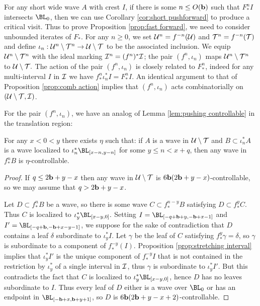 \documentclass[12pt]{amsart}
\begin{document}
For any short wide wave $A$ with crest $I$, if there is some $n\leq O(\mathbf b)$ such that $F_*^nI$ intersects $\BL_0$, then we can use Corollary \ref{cor:short pushforward} to produce a critical visit. Thus to prove Proposition \ref{prop:fast forward}, we need to consider unbounded iterates of $F_*$. 
For any $n\geq 0$, we set $\mathcal U^n = f^{-n}(\mathcal U)$ and $\mathcal T^n = f^{-n}(\mathcal T)$ and define $\iota_n: \mathcal U^n\setminus \mathcal T^n\to \mathcal U\setminus \mathcal T$ to be the associated inclusion. We equip $\mathcal U^n\setminus \mathcal T^n$ with the ideal marking $\mathcal I^n = (f^n)^*\mathcal I$;  the pair $(f^n, \iota_n)$ maps $\mathcal U^n\setminus \mathcal T^n$ to $\mathcal U\setminus \mathcal T.$
The action of the pair $(f^n, \iota_n)$ is closely related to $F_*^n$, indeed for any multi-interval $I$ in $\mathcal I$ we have $f_*^n\iota_n^*I = F_*^nI$. 
An identical argument to that of Proposition \ref{prop:comb action} implies that $(f^n, \iota_n)$ acts combinatorially on $(\mathcal U\setminus \mathcal T, \mathcal I)$.



For the pair $(f^n, \iota_n)$, we have an analog of Lemma \ref{lem:pushing controllable} in the translation region:

\begin{lem}\label{lem:fast pushing controllable}
	For any $x< 0 <  y$ there exists $\eta$ such that: if $A$ is a wave in $\mathcal U\setminus \mathcal T$ and $B\subset \iota_n^*A$ is a wave localized to $\iota_n^*\BL_{[x-n, y-n]}$ for some $y\leq n < x+q$, then any wave in $f_*^nB$ is $\eta$-controllable.
\end{lem}


\begin{proof}
	If $q\leq 2\mathbf b +y-x$ then any wave in $\mathcal U\setminus \mathcal T$ is $6\mathbf b(2\mathbf b+y-x)$-controllable, so we may assume that $q> 2\mathbf b +y-x$.
	
	
	Let $D\subset f_*^nB$ be a wave, so there is some wave $C\subset f_*^{n-y}B$ satisfying $D\subset f_*^yC$. Thus $C$ is localized to $\iota_y^*\BL_{[x-y, 0]}.$
	Setting $I = \BL_{[-q+\bound+y, -\bound+x-1]}$ and $I' = \BL_{[-q+\bound, -\bound+x-y-1]}$, we suppose for the sake of contradiction that $D$ contains a leaf $\delta$ subordinate to $\iota_y^*I.$ Let $\gamma$ be the leaf of $C$ satisfying $f_*^y\gamma= \delta$, so $\gamma$ is subordinate to a component of $f^{-y}_*(I)$.  Proposition \ref{prop:stretching interval} implies that
	$\iota_y^*I'$ is the unique component of $f^{-y}_*I$ that is not contained in the restriction by $\iota_y^*$ of a single interval in $\mathcal I$, thus $\gamma$ is subordinate to $\iota_y^*I'$. But this contradicts the fact that $C$ is localized to  $\iota_y^*\BL_{[x-y, 0]}$, hence $D$ has no leaves subordinate to $I$. 
	Thus every leaf of $D$ either is a wave over $\BL_0$ or has an endpoint in $\BL_{[-\bound+x, \bound+y+1]}$, so $D$ is $6\mathbf b(2\mathbf b+y-x+2)$-controllable.
\end{proof}
\end{document}
